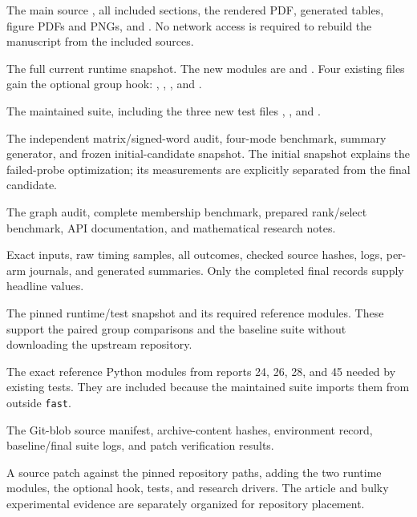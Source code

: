 \begin{description}[style=nextline,leftmargin=0pt,labelsep=0pt,labelwidth=0pt]
\item[\path{article/}]
  The main source , all included
  sections, the rendered PDF, generated tables, figure PDFs and PNGs,
  and . No network access is required to
  rebuild the manuscript from the included sources.
\item[\path{fast/fastunknot/}]
  The full current runtime snapshot. The new modules are
   and . Four existing
  files gain the optional group hook: ,
  , , and
  .
\item[\path{fast/tests/}]
  The maintained suite, including the three new test files
  ,
  , and
  .
\item[\path{fast/raw_saturation_research/}]
  The independent matrix/signed-word audit, four-mode benchmark,
  summary generator, and frozen initial-candidate snapshot. The
  initial snapshot explains the failed-probe optimization; its
  measurements are explicitly separated from the final candidate.
\item[\path{fast/orbit_index_research/}]
  The graph audit, complete membership benchmark, prepared rank/select
  benchmark, API documentation, and mathematical research notes.
\item[\path{fast/results/}]
  Exact inputs, raw timing samples, all outcomes, checked source hashes,
  logs, per-arm journals, and generated summaries. Only the completed
  final records supply headline values.
\item[\path{baseline/fast/} and \path{baseline/reports/}]
  The pinned runtime/test snapshot and its required reference modules.
  These support the paired group comparisons and the baseline suite
  without downloading the upstream repository.
\item[\path{reports/}]
  The exact reference Python modules from reports 24, 26, 28, and 45
  needed by existing tests. They are included because the maintained
  suite imports them from outside \texttt{fast}.
\item[\path{provenance/}]
  The Git-blob source manifest, archive-content hashes, environment
  record, baseline/final suite logs, and patch verification results.
\item[\path{integration.patch}]
  A source patch against the pinned repository paths, adding the two
  runtime modules, the optional hook, tests, and research drivers.
  The article and bulky experimental evidence are separately organized
  for repository placement.
\end{description}

